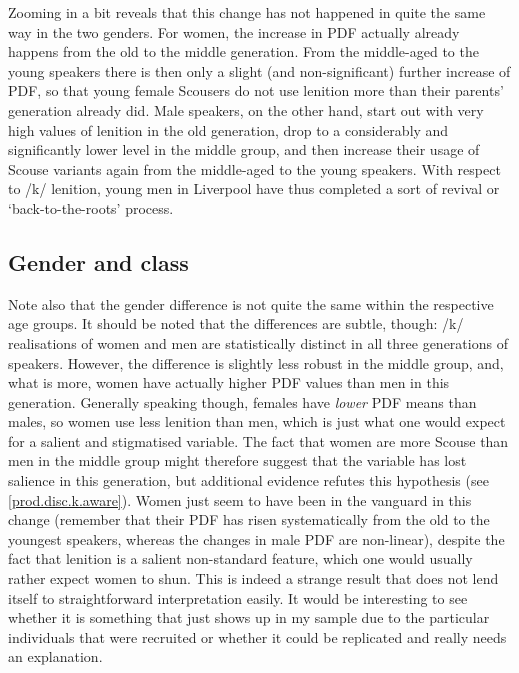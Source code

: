 Zooming in a bit reveals that this change has not happened in quite the same way in the two genders.
For women, the increase in PDF actually already happens from the old to the middle generation.
From the middle-aged to the young speakers there is then only a slight (and non-significant) further increase of PDF, so that young female Scousers do not use lenition more than their parents' generation already did.
Male speakers, on the other hand, start out with very high values of lenition in the old generation, drop to a considerably and significantly lower level in the middle group, and then increase their usage of Scouse variants again from the middle-aged to the young speakers.
With respect to /k/ lenition, young men in Liverpool have thus completed a sort of revival or `back-to-the-roots' process.

\subsection{Gender and class}
\label{prod.disc.k.social}

Note also that the gender difference is not quite the same within the respective age groups.
It should be noted that the differences are subtle, though: /k/ realisations of women and men are statistically distinct in all three generations of speakers.
However, the difference is slightly less robust in the middle group, and, what is more, women have actually higher PDF values than men in this generation.
Generally speaking though, females have \emph{lower} PDF means than males, so women use less lenition than men, which is just what one would expect for a salient and stigmatised variable.
The fact that women are more Scouse than men in the middle group might therefore suggest that the variable has lost salience in this generation, but additional evidence refutes this hypothesis (see \ref{prod.disc.k.aware}).
Women just seem to have been in the vanguard in this change (remember that their PDF has risen systematically from the old to the youngest speakers, whereas the changes in male PDF are non-linear), despite the fact that lenition is a salient non-standard feature, which one would usually rather expect women to shun.
This is indeed a strange result that does not lend itself to straightforward interpretation easily.
It would be interesting to see whether it is something that just shows up in my sample due to the particular individuals that were recruited or whether it could be replicated and really needs an explanation.

